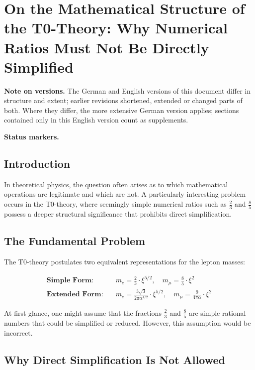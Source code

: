\section*{On the Mathematical Structure of the T0-Theory: Why Numerical Ratios Must Not Be Directly Simplified}

	\medskip\noindent\textbf{Note on versions.} The German and English versions of this document differ in structure and extent; earlier revisions shortened, extended or changed parts of both. Where they differ, the more extensive German version applies; sections contained only in this English version count as supplements.

	
	\medskip\noindent\textbf{Status markers.}
	

	
	\subsection*{Introduction}
	
	In theoretical physics, the question often arises as to which mathematical operations are legitimate and which are not. A particularly interesting problem occurs in the T0-theory, where seemingly simple numerical ratios such as \(\frac{2}{3}\) and \(\frac{8}{5}\) possess a deeper structural significance that prohibits direct simplification.
	
	\subsection*{The Fundamental Problem}
	
	The T0-theory postulates two equivalent representations for the lepton masses:
	
	\begin{align*}
		\textbf{Simple Form:} &\quad m_e = \frac{2}{3} \cdot \xi^{5/2}, \quad m_\mu = \frac{8}{5} \cdot \xi^2 \\
		\textbf{Extended Form:} &\quad m_e = \frac{3\sqrt{3}}{2\pi\alpha^{1/2}} \cdot \xi^{5/2}, \quad m_\mu = \frac{9}{4\pi\alpha} \cdot \xi^2
	\end{align*}
	
	At first glance, one might assume that the fractions \(\frac{2}{3}\) and \(\frac{8}{5}\) are simple rational numbers that could be simplified or reduced. However, this assumption would be incorrect.
	
	\subsection*{Why Direct Simplification Is Not Allowed}
	
